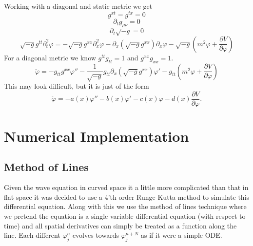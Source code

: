 \documentclass[11pt, oneside]{report}  %
\numberwithin{equation}{section}
\begin{document}
Working with a diagonal and static metric we get 
$$ g^{xt} = g^{tx}  =0$$
$$ \partial_t g_{\mu\nu} = 0$$
$$ \partial_t \sqrt{-g} =0$$
$$\sqrt{-g}g^{tt}\partial^2_t\varphi = -\sqrt{-g}g^{xx}\partial^2_x\varphi -\partial_x(\sqrt{-g}g^{xx})\partial_x\varphi- \sqrt{-g}\left(m^2\varphi+\frac{\partial V}{\partial \varphi}\right)$$
For a diagonal metric we know $g^{tt}g_{tt} = 1$ and $g^{xx}g_{xx} = 1$.
$$\boxed{\ddot \varphi = -g_{tt}g^{xx}\varphi''- \frac{1}{\sqrt{-g}}g_{tt}\partial_x(\sqrt{-g}g^{xx})\varphi' - g_{tt} \left(m^2\varphi+\frac{\partial V}{\partial \varphi}\right)}$$
This may look difficult, but it is just of the form
$$ \ddot \varphi = -a(x)\varphi'' -b(x)\varphi' - c(x) \varphi - d(x)\frac{\partial V}{\partial \varphi}.$$

\section{Numerical Implementation}
\subsection{Method of Lines}
Given the wave equation in curved space it a little more complicated than that in flat space it was decided to use a 4'th order Runge-Kutta method to simulate this differential equation. Along with this we use the method of lines technique where we pretend the equation is a single variable differential equation (with respect to time) and all spatial derivatives can simply be treated as a function along the line. Each different $\varphi^n_j$ evolves towards $\varphi^{n+N}_j$ as if it were a simple ODE. 
\end{document}
